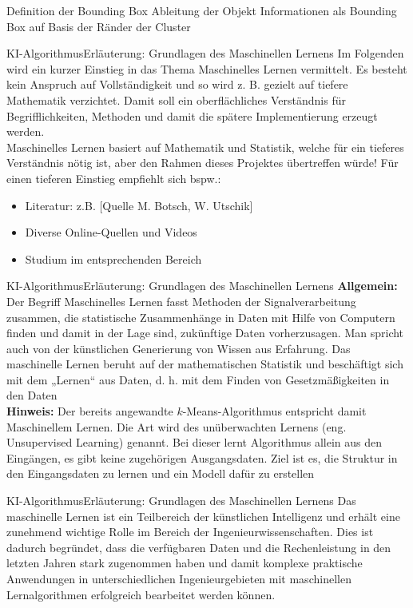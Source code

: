 \documentclass[169, handout	]{THIbeamer} %
\begin{document}
	\begin{frame}{Definition der Bounding Box}
		Ableitung der Objekt Informationen als Bounding Box auf Basis der Ränder der Cluster
	\end{frame}
	\begin{frame}{KI-Algorithmus}{Erläuterung: Grundlagen des Maschinellen Lernens}
		\vspace{1 cm}		
		Im Folgenden wird ein kurzer Einstieg in das Thema Maschinelles Lernen vermittelt. Es besteht kein Anspruch auf Vollständigkeit und so wird z. B. gezielt auf tiefere Mathematik verzichtet. Damit soll ein oberflächliches Verständnis für Begrifflichkeiten, Methoden und damit die spätere Implementierung erzeugt werden. \\
		Maschinelles Lernen basiert auf Mathematik und Statistik, welche für ein tieferes Verständnis nötig ist, aber den Rahmen dieses Projektes übertreffen würde!
		Für einen tieferen Einstieg empfiehlt sich bspw.: 
		\begin{itemize}
			\item  Literatur: z.B. [Quelle M. Botsch, W. Utschik]
			\item Diverse Online-Quellen und Videos
			\item Studium im entsprechenden Bereich 
		\end{itemize}
	\end{frame}
	\begin{frame}{KI-Algorithmus}{Erläuterung: Grundlagen des Maschinellen Lernens}
		\textbf{Allgemein:} Der Begriff Maschinelles Lernen fasst Methoden der Signalverarbeitung zusammen, die statistische Zusammenhänge in Daten mit Hilfe von Computern finden und damit in der Lage sind, zukünftige Daten vorherzusagen. Man spricht auch von der künstlichen Generierung von Wissen aus Erfahrung. Das maschinelle Lernen beruht auf der mathematischen Statistik und beschäftigt sich mit dem „Lernen“ aus Daten, d. h. mit dem Finden von Gesetzmäßigkeiten in den Daten\\
		\vspace{0.5cm}
		\textbf{Hinweis:} Der bereits angewandte $k$-Means-Algorithmus entspricht damit Maschinellem Lernen. Die Art wird des unüberwachten Lernens (eng. Unsupervised Learning) genannt. Bei dieser lernt Algorithmus allein aus den Eingängen, es gibt keine zugehörigen Ausgangsdaten. Ziel ist es, die Struktur in den Eingangsdaten zu lernen und ein Modell dafür zu erstellen
	\end{frame}
	\begin{frame}{KI-Algorithmus}{Erläuterung: Grundlagen des Maschinellen Lernens}
		\vspace{1cm}
		Das maschinelle Lernen ist ein Teilbereich der künstlichen Intelligenz und erhält eine zunehmend wichtige Rolle im Bereich der Ingenieurwissenschaften. Dies ist dadurch begründet, dass die verfügbaren Daten und die Rechenleistung in den letzten Jahren stark zugenommen haben und damit komplexe praktische Anwendungen in unterschiedlichen Ingenieurgebieten mit maschinellen Lernalgorithmen erfolgreich bearbeitet werden können.
	\end{frame}
\end{document}
